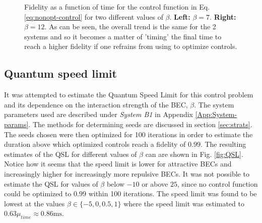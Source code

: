 \documentclass[a4paper, twocolumn]{revtex4-1}
\begin{document}
\begin{figure}
\begin{subfigure}{0.45\columnwidth}
	\end{subfigure}
	\caption{Fidelity as a function of time for the control function in Eq. \eqref{eq:nonopt-control} for two different values of $\beta$. \textbf{Left:} $\beta=7$. \textbf{Right:} $\beta=12$. As can be seen, the overall trend is the same for the 2 systems and so it becomes a matter of 'timing' the final time to reach a higher fidelity if one refrains from using  to optimize controls.}
	\label{fig:fidelityplot}
\end{figure}

\subsection{Quantum speed limit}
It was attempted to estimate the Quantum Speed Limit for this control problem and its dependence on the interaction strength of the BEC, $\beta$. The system parameters used are described under \textit{System B1} in Appendix \ref{App:System-params}. The methods for determining seeds are discussed in section \ref{sec:strats}. The seeds chosen were then optimized for 100 iterations in order to estimate the duration above which optimized controls reach a fidelity of $0.99$. The resulting estimates of the QSL for different values of $\beta$ can are shown in Fig. \ref{fig:QSL}. Notice how it seems that the speed limit is lower for attractive BECs and increasingly higher for increasingly more repulsive BECs. It was not possible to estimate the QSL for values of $\beta$ below $-10$ or above $25$, since no control function could be optimized to $0.99$ within 100 iterations. The speed limit was found to be lowest at the values $\beta\in\{-5,0,0.5,1\}$ where the speed limit was estimated to $0.63\mu_{time} \approx 0.86\text{ms}$.\\
\end{document}
